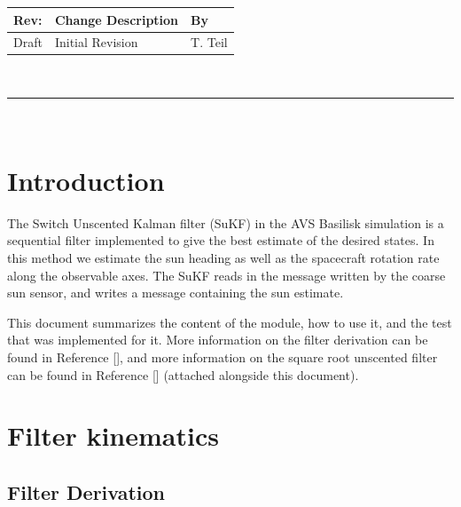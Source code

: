 \documentclass[]{BasiliskReportMemo}
\begin{document}
\makeCover



%
%
\pagestyle{empty}
{\renewcommand{\arraystretch}{2}
\noindent
\begin{longtable}{|p{0.5in}|p{4.5in}|p{1.14in}|}
\hline
{\bfseries Rev}: & {\bfseries Change Description} & {\bfseries By} \\
\hline
Draft & Initial Revision & T. Teil \\
\hline

\end{longtable}
}

\newpage
\setcounter{page}{1}
\pagestyle{fancy}

\tableofcontents
~\\ \hrule ~\\


\section{Introduction}
The Switch Unscented Kalman filter (SuKF) in the AVS Basilisk simulation is a sequential
filter implemented to give the best estimate of the desired states.
In this method we estimate the sun heading as well as the spacecraft rotation rate along the observable axes.
The SuKF reads in the message written by the coarse sun sensor, and writes a message 
containing the sun estimate. 

This document summarizes the content of the module, how to use it, and the test that 
was implemented for it. More information on the filter derivation can be found in Reference [], and more information on the square root unscented filter can be found in Reference [] (attached alongside this document).

\section{Filter kinematics}

\subsection{Filter Derivation} %
\end{document}
